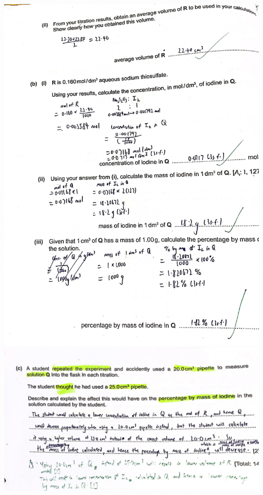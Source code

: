 \documentclass[oneside]{book}
\begin{document}
\begin{center}
        \includegraphics[width=\textwidth,height=\textheight,keepaspectratio]{images/D9D56D6E-4EA3-42B8-B9DC-6B69A7EDA7AE.jpeg}\\
        \includegraphics[width=\textwidth,height=\textheight,keepaspectratio]{images/F7022429-B8B7-402E-A2D4-0BDFD17A3484.jpeg}
\end{center}
\newpage
\end{document}
